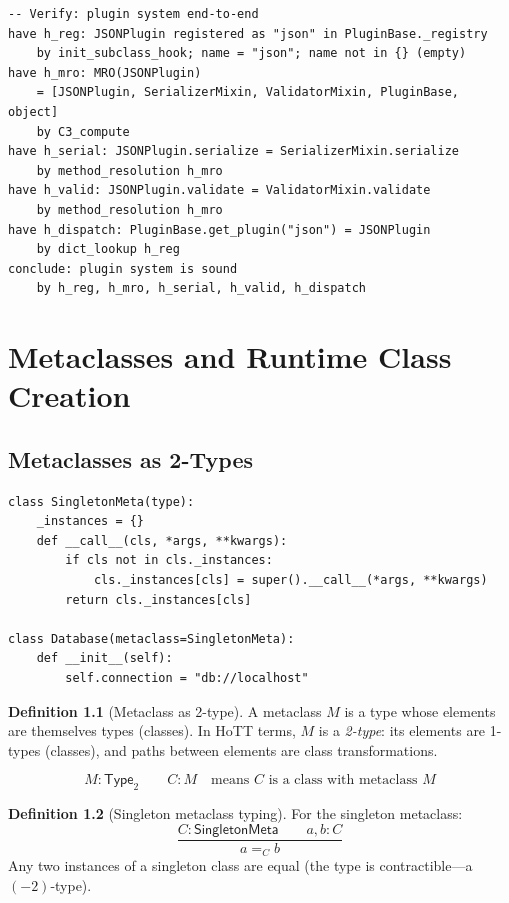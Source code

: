 \documentclass[11pt,a4paper]{report}
\theoremstyle{definition}
\newtheorem{definition}{Definition}[chapter]
\theoremstyle{plain}
\newcommand{\Type}{\mathsf{Type}}
\begin{document}
\begin{lstlisting}[style=proof]
-- Verify: plugin system end-to-end
have h_reg: JSONPlugin registered as "json" in PluginBase._registry
    by init_subclass_hook; name = "json"; name not in {} (empty)
have h_mro: MRO(JSONPlugin)
    = [JSONPlugin, SerializerMixin, ValidatorMixin, PluginBase, object]
    by C3_compute
have h_serial: JSONPlugin.serialize = SerializerMixin.serialize
    by method_resolution h_mro
have h_valid: JSONPlugin.validate = ValidatorMixin.validate
    by method_resolution h_mro
have h_dispatch: PluginBase.get_plugin("json") = JSONPlugin
    by dict_lookup h_reg
conclude: plugin system is sound
    by h_reg, h_mro, h_serial, h_valid, h_dispatch
\end{lstlisting}


\chapter{Metaclasses and Runtime Class Creation}
\label{ch:metaclasses}

\section{Metaclasses as 2-Types}

\begin{lstlisting}[style=python]
class SingletonMeta(type):
    _instances = {}
    def __call__(cls, *args, **kwargs):
        if cls not in cls._instances:
            cls._instances[cls] = super().__call__(*args, **kwargs)
        return cls._instances[cls]

class Database(metaclass=SingletonMeta):
    def __init__(self):
        self.connection = "db://localhost"
\end{lstlisting}

\begin{definition}[Metaclass as 2-type]
A metaclass $M$ is a type whose elements are themselves types (classes).
In HoTT terms, $M$ is a \emph{2-type}: its elements are 1-types (classes),
and paths between elements are class transformations.

\[
  M : \Type_2 \qquad C : M \quad\text{means $C$ is a class with metaclass $M$}
\]
\end{definition}

\begin{definition}[Singleton metaclass typing]
For the singleton metaclass:
\[
  \frac{
    C : \mathsf{SingletonMeta} \qquad
    a, b : C
  }{
    a =_C b
  }
\]
Any two instances of a singleton class are equal (the type is contractible---a
$(-2)$-type).
\end{definition}
\end{document}
